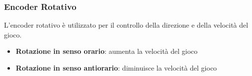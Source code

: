 \documentclass[a4paper, 12pt]{article}
\begin{document}
\subsubsection{Encoder Rotativo}
L'encoder rotativo è utilizzato per il controllo della direzione e della velocità del gioco.\\
\begin{itemize}
    \item \textbf{Rotazione in senso orario}: aumenta la velocità del gioco
    \item \textbf{Rotazione in senso antiorario}: diminuisce la velocità del gioco
\end{itemize}
\end{document}
